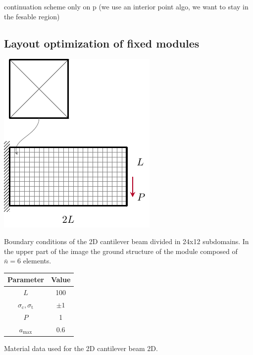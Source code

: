 continuation scheme only on p (we use an interior point algo, we want to stay in the fesable region)
\subsection{Layout optimization of fixed modules}
\begin{marginfigure}
    \centering
    \includegraphics[width=\linewidth]{figures/06_DMO/00_cantilever_bcs/cant_mesh.pdf}
    \caption{Boundary conditions of the 2D cantilever beam divided in 24x12 subdomains. In the upper part of the image the ground structure of the module composed of $\bar{n}=6$ elements.}
    \label{fig:06_cant_BC_GS}
\end{marginfigure}
\begin{margintable}
    \small
    \centering
    \begin{tabular}{cc}
    \toprule
    \textbf{Parameter}        & \textbf{Value} \\ \midrule
    $L$              & 100     \\
    $\sigma_\text{c}, \sigma_\text{t}$ & $\pm 1$\\
    $P$              & 1   \\
    $a_\text{max}$              & 0.6   \\
    \bottomrule
    \end{tabular}
    \caption{Material data used for the 2D cantilever beam 2D.}
    \label{tab:06_modular_cant_data}
\end{margintable}
